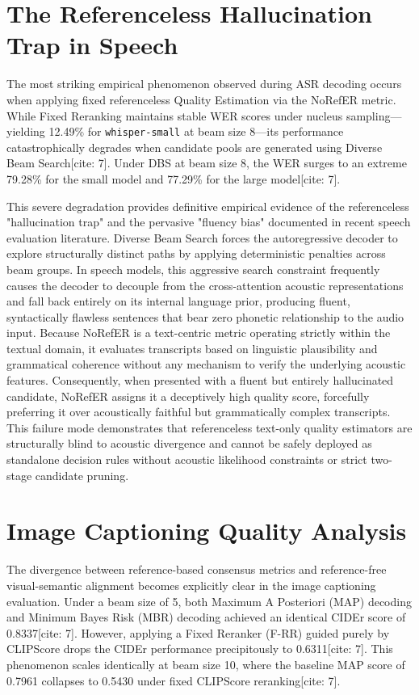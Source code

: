 \section{The Referenceless Hallucination Trap in Speech}
\label{sec:hallucination_trap}

The most striking empirical phenomenon observed during ASR decoding occurs when applying fixed referenceless Quality Estimation via the NoRefER metric. While Fixed Reranking maintains stable WER scores under nucleus sampling—yielding 12.49\% for \texttt{whisper-small} at beam size 8—its performance catastrophically degrades when candidate pools are generated using Diverse Beam Search[cite: 7]. Under DBS at beam size 8, the WER surges to an extreme 79.28\% for the small model and 77.29\% for the large model[cite: 7].

This severe degradation provides definitive empirical evidence of the referenceless "hallucination trap" and the pervasive "fluency bias" documented in recent speech evaluation literature. Diverse Beam Search forces the autoregressive decoder to explore structurally distinct paths by applying deterministic penalties across beam groups. In speech models, this aggressive search constraint frequently causes the decoder to decouple from the cross-attention acoustic representations and fall back entirely on its internal language prior, producing fluent, syntactically flawless sentences that bear zero phonetic relationship to the audio input. Because NoRefER is a text-centric metric operating strictly within the textual domain, it evaluates transcripts based on linguistic plausibility and grammatical coherence without any mechanism to verify the underlying acoustic features. Consequently, when presented with a fluent but entirely hallucinated candidate, NoRefER assigns it a deceptively high quality score, forcefully preferring it over acoustically faithful but grammatically complex transcripts. This failure mode demonstrates that referenceless text-only quality estimators are structurally blind to acoustic divergence and cannot be safely deployed as standalone decision rules without acoustic likelihood constraints or strict two-stage candidate pruning.

\section{Image Captioning Quality Analysis}
\label{sec:image_captioning_quality}

The divergence between reference-based consensus metrics and reference-free visual-semantic alignment becomes explicitly clear in the image captioning evaluation. Under a beam size of 5, both Maximum A Posteriori (MAP) decoding and Minimum Bayes Risk (MBR) decoding achieved an identical CIDEr score of 0.8337[cite: 7]. However, applying a Fixed Reranker (F-RR) guided purely by CLIPScore drops the CIDEr performance precipitously to 0.6311[cite: 7]. This phenomenon scales identically at beam size 10, where the baseline MAP score of 0.7961 collapses to 0.5430 under fixed CLIPScore reranking[cite: 7].

